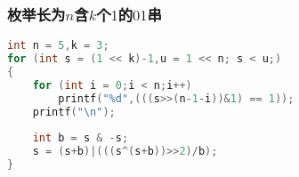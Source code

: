     \subsubsection{枚举长为$n$含$k$个$1$的$01$串}
	\begin{lstlisting}[language=c++]
int n = 5,k = 3;
for (int s = (1 << k)-1,u = 1 << n; s < u;)
{
    for (int i = 0;i < n;i++)
        printf("%d",(((s>>(n-1-i))&1) == 1));
    printf("\n");
    
    int b = s & -s;
    s = (s+b)|(((s^(s+b))>>2)/b);
}
	\end{lstlisting}
